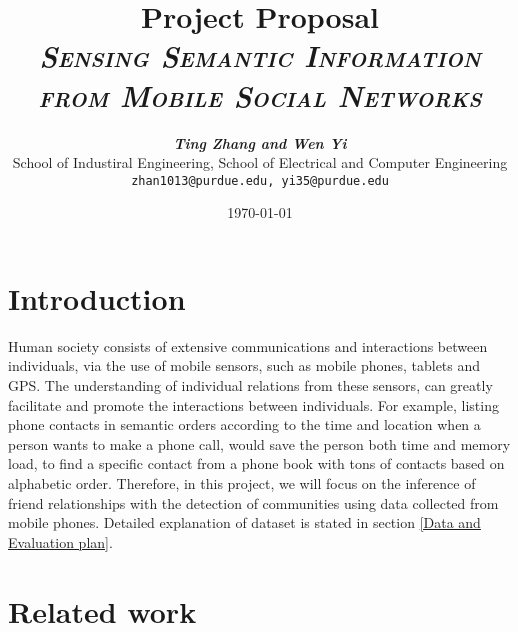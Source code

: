 \documentclass[11pt]{article}
\title{
\textbf{Project Proposal} \\ \textsc{\textit{Sensing Semantic Information from Mobile Social Networks}} \\
}
\author{
	\textbf{\textit{Ting Zhang and Wen Yi}} \\
	School of Industiral Engineering, School of Electrical and Computer Engineering\\
	\texttt{zhan1013@purdue.edu, yi35@purdue.edu}
}
\date{\today}
\begin{document}
\maketitle


\section{Introduction}
Human society consists of extensive communications and interactions between individuals, via the use of mobile sensors, such as mobile phones, tablets and GPS. The understanding of individual relations from these sensors, can greatly facilitate and promote the interactions between individuals. For example, listing phone contacts in semantic orders according to the time and location when a person wants to make a phone call, would save the person both time and memory load, to find a specific contact from a phone book with tons of contacts based on alphabetic order.
Therefore, in this project, we will focus on the inference of friend relationships with the detection of communities using data collected from mobile phones. Detailed explanation of dataset is stated in section \ref{Data and Evaluation plan}.

\section{Related work}
\end{document}
